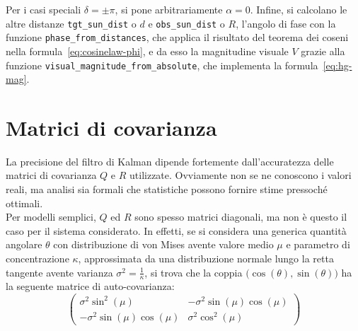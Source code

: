 \documentclass[12pt,a4paper,openright,twoside]{book}
\begin{document}
Per i casi speciali $\delta=\pm\pi$, si pone arbitrariamente $\alpha=0$. Infine, si calcolano le altre distanze \lstinline{tgt_sun_dist} o $d$ e \lstinline{obs_sun_dist} o $R$, l'angolo di fase con la funzione \lstinline{phase_from_distances}, che applica il risultato del teorema dei coseni nella formula~\ref{eq:cosinelaw-phi}, e da esso la magnitudine visuale $V$ grazie alla funzione \lstinline{visual_magnitude_from_absolute}, che implementa la formula~\ref{eq:hg-mag}.

\section{Matrici di covarianza}\label{sec:real-system-covs}

La precisione del filtro di Kalman dipende fortemente dall'accuratezza delle matrici di covarianza $Q$ e $R$ utilizzate. Ovviamente non se ne conoscono i valori reali, ma analisi sia formali che statistiche possono fornire stime pressoché ottimali. \\
Per modelli semplici, $Q$ ed $R$ sono spesso matrici diagonali, ma non è questo il caso per il sistema considerato. In effetti, se si considera una generica quantità angolare $\theta$ con distribuzione di von Mises avente valore medio $\mu$ e parametro di concentrazione $\kappa$, approssimata da una distribuzione normale lungo la retta tangente avente varianza $\sigma^2=\frac{1}{\kappa}$, si trova che la coppia $\bigl(\cos(\theta),\sin(\theta)\bigr)$ ha la seguente matrice di auto-covarianza:
\begin{equation}
\begin{pmatrix}
\sigma^2\sin^2(\mu) & -\sigma^2\sin(\mu)\cos(\mu) \\
-\sigma^2\sin(\mu)\cos(\mu) & \sigma^2\cos^2(\mu)
\end{pmatrix}
\end{equation}
\end{document}
